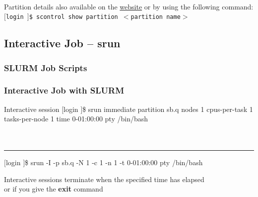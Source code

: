 \begin{frame}
{\begin{tabular}{l || c || c || c || c || c || c}
\bottomrule 
\end{tabular}   
}
\\
\bigskip
Partition details also available on the \href{http://www.hawaii.edu/its/ci/hpc-resources/slurm-partitions/}{{\ci} website} or by using the following command:
\\
\texttt{$[$login \ctilde$]$\$ scontrol show partition $<$partition name$>$}
\end{frame}

\subsection{Interactive Job -- srun}
\frametitle{SLURM Job Scripts}
\begin{frame}
  \frametitle{Interactive Job with SLURM}
  \begin{block}{Interactive session}\tiny
    $[$login \ctilde$]$\$ srun \ddash{}immediate \ddash{}partition sb.q \ddash{}nodes 1 \ddash{}cpus-per-task 1 \ddash{}tasks-per-node 1 \ddash{}time 0-01:00:00 \ddash{}pty /bin/bash
    ~\\
    ~\\
    ~\\
    \hrule\begin{semiverbatim}$[$login \ctilde$]$\$ srun -I -p sb.q -N 1 -c 1 -n 1 -t 0-01:00:00 \ddash{}pty /bin/bash\end{semiverbatim}

  \end{block}
  \btVFill
  \begin{center}Interactive sessions terminate when the specified time has elapsed~\\or if you give the \textbf{exit} command \end{center}

  \end{frame}



